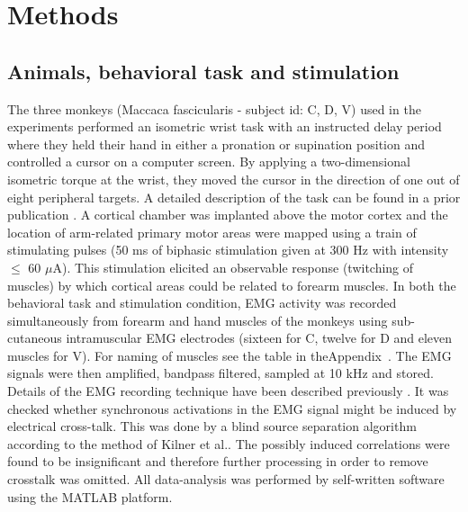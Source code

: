 \chapter{Methods} %
\label{sg:cha:methods}

% 
\section{Animals, behavioral task and stimulation} %
\label{sg:sec:animals_and_behavioral_task}

The three monkeys (Maccaca fascicularis - subject id: C, D, V) used in the experiments performed an isometric wrist task with an instructed delay period where they held their hand in either a pronation or supination position and controlled a cursor on a computer screen. By applying a two-dimensional isometric torque at the wrist, they moved the cursor in the direction of one out of eight peripheral targets. A detailed description of the task can be found in a prior publication \citet{Yanai:2007p2455}.
A cortical chamber was implanted above the motor cortex and the location of arm-related primary motor areas were mapped using a train of stimulating pulses (50 ms of biphasic stimulation given at 300 Hz with intensity $\leq$ 60 $\mu$A). This stimulation elicited an observable response (twitching of muscles) by which cortical areas could be related to forearm muscles. 
In both the behavioral task and stimulation condition, EMG activity was recorded simultaneously from forearm and hand muscles of the monkeys using sub-cutaneous intramuscular EMG electrodes (sixteen for C, twelve for D and eleven muscles for V). For naming of muscles see the table in theAppendix~. The EMG signals were then amplified, bandpass filtered, sampled at 10 kHz and stored. Details of the EMG recording technique have been described previously \citet{Prut:2003p2780}. It was checked whether synchronous activations in the EMG signal might be induced by electrical cross-talk. This was done by a blind source separation algorithm\citet{Chan:1995p3040} according to the method of Kilner et al.\citet{Kilner:2002p2941}. The possibly induced correlations were found to be insignificant and therefore further processing in order to remove crosstalk was omitted. All data-analysis was performed by self-written software using the MATLAB platform\citet{code}.
